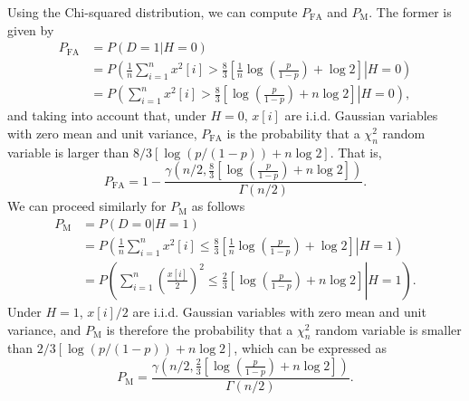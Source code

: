 Using the Chi-squared distribution, we can compute $P_{\text{FA}}$ and $P_{\text{M}}$. The former is given by
\begin{align*}
	P_{\text{FA}} &= P(D = 1 | H = 0) \\ 
	&= P \left(\left. \frac{1}{n} \sum_{i = 1}^{n} x^2[i]  > \frac{8}{3} \left[ \frac{1}{n}  \log \left(\frac{p}{1 - p}  \right) + \log 2 \right] \right| H = 0 \right) \\ 
	&= P \left(\left. \sum_{i = 1}^{n} x^2[i]  > \frac{8}{3} \left[\log \left(\frac{p}{1 - p}  \right) + n \log 2 \right] \right| H = 0 \right),
\end{align*}
and taking into account that, under $H = 0$, $x[i]$ are i.i.d. Gaussian variables with zero mean and unit variance, $P_{\text{FA}}$ is the probability that a $\chi^2_n$ random variable is larger than $8/3 \left[\log \left(p/(1 - p)  \right) + n \log 2\right]$. That is,
\begin{equation*}
	P_{\text{FA}} = 1 - \frac{\gamma \left(n/2,\frac{8}{3} \left[\log \left(\frac{p}{1 - p}\right) + n \log 2 \right]\right)}{\Gamma(n/2)}.
\end{equation*}
We can proceed similarly for $P_{\text{M}}$ as follows
\begin{align*}
	P_{\text{M}} &= P(D = 0 | H = 1) \\ 
	&= P \left(\left. \frac{1}{n} \sum_{i = 1}^{n} x^2[i]  \leq \frac{8}{3} \left[ \frac{1}{n}  \log \left(\frac{p}{1 - p}  \right) + \log 2 \right] \right| H = 1 \right) \\ 
	&= P \left(\left. \sum_{i = 1}^{n} \left(\frac{x[i]}{2}\right)^2  \leq \frac{2}{3} \left[\log \left(\frac{p}{1 - p}  \right) + n \log 2 \right] \right| H = 1 \right).
\end{align*}
Under $H = 1$, $x[i]/2$ are i.i.d. Gaussian variables with zero mean and unit variance, and $P_{\text{M}}$ is therefore the probability that a $\chi^2_n$ random variable is smaller than $2/3 \left[\log \left(p/(1 - p)  \right) + n \log 2\right]$, which can be expressed as
\begin{equation*}
	P_{\text{M}} = \frac{\gamma \left(n/2,\frac{2}{3} \left[\log \left(\frac{p}{1 - p}  \right) + n \log 2 \right]\right)}{\Gamma(n/2)}.
\end{equation*}
